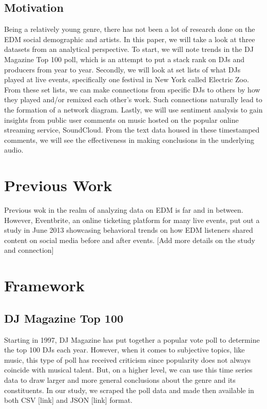 \documentclass[12pt]{dalcsthesis}
\begin{document}
\section{Motivation}

Being a relatively young genre, there has not been a lot of research done on the EDM social demographic and artists. In this paper, we will take a look at three datasets from an analytical perspective. To start, we will note trends in the DJ Magazine Top 100 poll, which is an attempt to put a stack rank on DJs and producers from year to year. Secondly, we will look at set lists of what DJs played at live events, specifically one festival in New York called Electric Zoo. From these set lists, we can make connections from specific DJs to others by how they played and/or remixed each other's work. Such connections naturally lead to the formation of a network diagram. Lastly, we will use sentiment analysis to gain insights from public user comments on music hosted on the popular online streaming service, SoundCloud. From the text data housed in these timestamped comments, we will see the effectiveness in making conclusions in the underlying audio.

\chapter{Previous Work}

Previous wok in the realm of analyzing data on EDM is far and in between. However, Eventbrite, an online ticketing platform for many live events, put out a study in June 2013 showcasing behavioral trends on how EDM listeners shared content on social media before and after events. [Add more details on the study and connection]

\chapter{Framework}

\section{DJ Magazine Top 100}

Starting in 1997, DJ Magazine has put together a popular vote poll to determine the top 100 DJs each year. However, when it comes to subjective topics, like music, this type of poll has received criticism since popularity does not always coincide with musical talent. But, on a higher level, we can use this time series data to draw larger and more general conclusions about the genre and its constituents. In our study, we scraped the poll data and made then available in both CSV [link] and JSON [link] format. 
\end{document}
